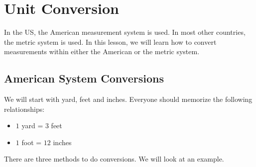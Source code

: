 
\section{Unit Conversion}

In the US, the American measurement system is used. In most other countries, the metric system is used. In this lesson, we will learn how to convert measurements within either the American or the metric system.

\subsection{American System Conversions}
We will start with yard, feet and inches. Everyone should memorize the following relationships:
\begin{itemize}
\item $1$ yard = $3$ feet
\item $1$ foot = $12$ inches
\end{itemize}

There are three methods to do conversions. We will look at an example.

